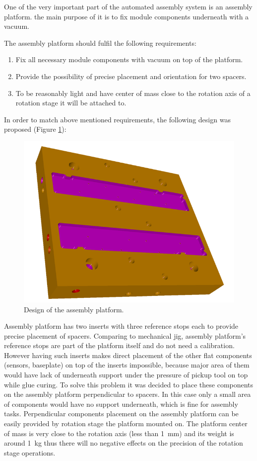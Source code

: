 One of the very important part of the automated assembly system is an assembly platform. the main purpose of it is to fix module components underneath with a vacuum.

The assembly platform should fulfil the following requirements:

\begin{enumerate}
\setlength\itemsep{-0.5em}
\item Fix all necessary module components with vacuum on top of the platform.
\item Provide the possibility of precise placement and orientation for two spacers.
\item To be reasonably light and have center of mass close to the rotation axis of a rotation stage it will be attached to.
\end{enumerate}

In order to match above mentioned requirements, the following design was proposed (Figure \ref{fig:platform_design}):

\begin{figure}[ht]\centering
\includegraphics[width=0.7\linewidth]{Data/Module_assembly/Platform_design.png}
\caption{Design of the assembly platform.}
\label{fig:platform_design}
\end{figure}

Assembly platform has two inserts with three reference stops each to provide precise placement of spacers. Comparing to mechanical jig, assembly platform's reference stops are part of the platform itself and do not need a calibration. However having such inserts makes direct placement of the other flat components (sensors, baseplate) on top of the inserts impossible, because major area of them would have lack of underneath support under the pressure of pickup tool on top while glue curing. To solve this problem it was decided to place these components on the assembly platform perpendicular to spacers. In this case only a small area of components would have no support underneath, which is fine for assembly tasks. Perpendicular components placement on the assembly platform can be easily provided by rotation stage the platform mounted on. The platform center of mass is very close to the rotation axis (less than 1~mm) and its weight is around 1~kg thus there will no negative effects on the precision of the rotation stage operations. 

